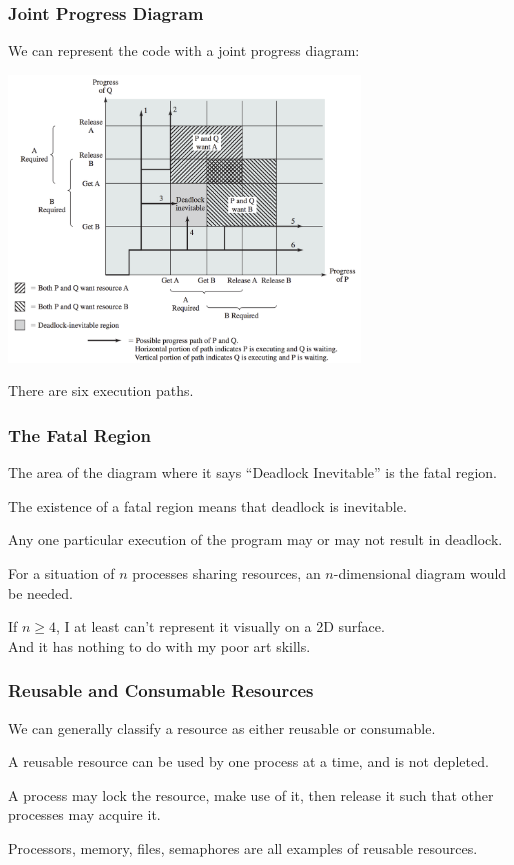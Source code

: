 \begin{frame}
\frametitle{Joint Progress Diagram}

We can represent the code with a \alert{joint progress diagram}:

\begin{center}
\includegraphics[width=0.7\textwidth]{images/joint-progress}
\end{center}

There are six execution paths.

\end{frame}

\begin{frame}
\frametitle{The Fatal Region}

The area of the diagram where it says ``Deadlock Inevitable'' is the \alert{fatal region}. 

The existence of a fatal region means that deadlock is inevitable.

Any one particular execution of the program may or may not result in deadlock.

For a situation of $n$ processes sharing resources, an $n$-dimensional diagram would be needed.

If $n \geq 4$, I at least can't represent it visually on a 2D surface.\\
\quad And it has nothing to do with my poor art skills.


\end{frame}

\begin{frame}
\frametitle{Reusable and Consumable Resources}
We can generally classify a resource as either \alert{reusable} or \alert{consumable}. 

A reusable resource can be used by one process at a time, and is not depleted.

A process may lock the resource, make use of it, then release it such that other processes may acquire it. 

Processors, memory, files, semaphores are all examples of reusable resources.

\end{frame}

